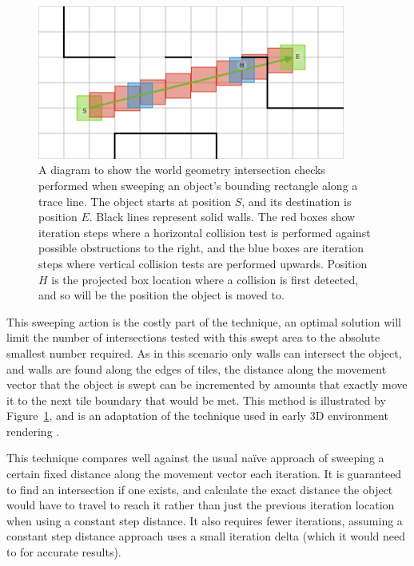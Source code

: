 \documentclass[12pt,a4paper]{article}
\begin{document}
\begin{figure}[h]
\centering
\includegraphics[width=0.9\textwidth]{trace}
\caption{A diagram to show the world geometry intersection checks performed when sweeping an object's bounding rectangle along a trace line. The object starts at position $S$, and its destination is position $E$. Black lines represent solid walls. The red boxes show iteration steps where a horizontal collision test is performed against possible obstructions to the right, and the blue boxes are iteration steps where vertical collision tests are performed upwards. Position $H$ is the projected box location where a collision is first detected, and so will be the position the object is moved to.}
\label{fig:trace}
\end{figure}

This sweeping action is the costly part of the technique, an optimal solution will limit the number of intersections tested with this swept area to the absolute smallest number required. As in this scenario only walls can intersect the object, and walls are found along the edges of tiles, the distance along the movement vector that the object is swept can be incremented by amounts that exactly move it to the next tile boundary that would be met. This method is illustrated by Figure~\ref{fig:trace}, and is an adaptation of the technique used in early 3D environment rendering \cite{raycast}.

This technique compares well against the usual na\"{i}ve approach of sweeping a certain fixed distance along the movement vector each iteration. It is guaranteed to find an intersection if one exists, and calculate the exact distance the object would have to travel to reach it rather than just the previous iteration location when using a constant step distance. It also requires fewer iterations, assuming a constant step distance approach uses a small iteration delta (which it would need to for accurate results).
\end{document}
